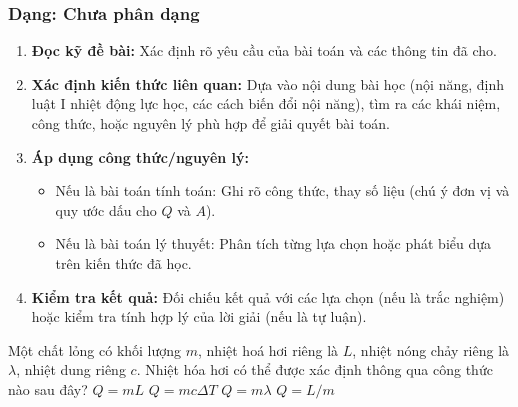 \subsubsection{Dạng: Chưa phân dạng}
\begin{phuongphap}
\begin{enumerate}
\item \textbf{Đọc kỹ đề bài:} Xác định rõ yêu cầu của bài toán và các thông tin đã cho.
\item \textbf{Xác định kiến thức liên quan:} Dựa vào nội dung bài học (nội năng, định luật I nhiệt động lực học, các cách biến đổi nội năng), tìm ra các khái niệm, công thức, hoặc nguyên lý phù hợp để giải quyết bài toán.
\item \textbf{Áp dụng công thức/nguyên lý:}
    \begin{itemize}
        \item Nếu là bài toán tính toán: Ghi rõ công thức, thay số liệu (chú ý đơn vị và quy ước dấu cho $Q$ và $A$).
        \item Nếu là bài toán lý thuyết: Phân tích từng lựa chọn hoặc phát biểu dựa trên kiến thức đã học.
    \end{itemize}
\item \textbf{Kiểm tra kết quả:} Đối chiếu kết quả với các lựa chọn (nếu là trắc nghiệm) hoặc kiểm tra tính hợp lý của lời giải (nếu là tự luận).
\end{enumerate}
\end{phuongphap}
\begin{vidumau}
Một chất lỏng có khối lượng $m$, nhiệt hoá hơi riêng là $L$, nhiệt nóng chảy riêng là $\lambda$, nhiệt dung riêng $c$. Nhiệt hóa hơi có thể được xác định thông qua công thức nào sau đây?
\choice
{\True $Q = mL$}
{$Q = mc\Delta T$}
{$Q = m\lambda$}
{$Q = L/m$}
\end{vidumau}
